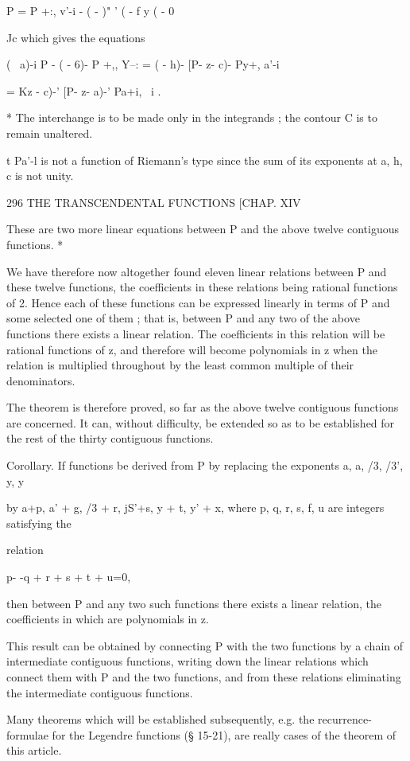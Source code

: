 P = P +:, v'-i - ( - )" ' ( - f y ( - 0

Jc which gives the equations

( \ a)-i P - ( - 6)- P +,, Y--: = ( - h)- [P- z- c)- Py+, a'-i

= Kz - c)-' [P- z- a)-' Pa+i, \ i .

* The interchange is to be made only in the integrands ; the contour C
is to remain unaltered.

t Pa'-l is not a function of Riemann's type since the sum of its
exponents at a, h, c is not unity.



296 THE TRANSCENDENTAL FUNCTIONS [CHAP. XIV

These are two more linear equations between P and the above twelve
contiguous functions. *

We have therefore now altogether found eleven linear relations between
P and these twelve functions, the coefficients in these relations
being rational functions of 2. Hence each of these functions can be
expressed linearly in terms of P and some selected one of them ; that
is, between P and any two of the above functions there exists a linear
relation. The coefficients in this relation will be rational functions
of z, and therefore will become polynomials in z when the relation is
multiplied throughout by the least common multiple of their
denominators.

The theorem is therefore proved, so far as the above twelve contiguous
functions are concerned. It can, without difficulty, be extended so as
to be established for the rest of the thirty contiguous functions.

Corollary. If functions be derived from P by replacing the exponents
a, a, /3, /3', y, y

by a+p, a' + g, /3 + r, jS'+s, y + t, y' + x, where p, q, r, s, f, u
are integers satisfying the

relation

p- -q + r + s + t + u=0,

then between P and any two such functions there exists a linear
relation, the coefficients in which are polynomials in z.

This result can be obtained by connecting P with the two functions by
a chain of intermediate contiguous functions, writing down the linear
relations which connect them with P and the two functions, and from
these relations eliminating the intermediate contiguous functions.

Many theorems which will be established subsequently, e.g. the
recurrence-formulae for the Legendre functions (§ 15-21), are really
cases of the theorem of this article.

